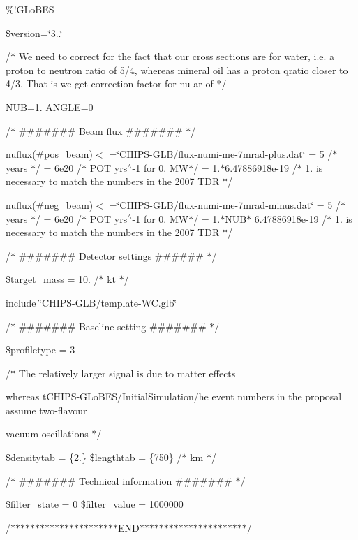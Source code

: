 \%!\+G\+Lo\+B\+ES

\$version=\char`\"{}3..\char`\"{}

/$\ast$ We need to correct for the fact that our cross sections are for water, i.\+e. a proton to neutron ratio of 5/4, whereas mineral oil has a proton qratio closer to 4/3. That is we get correction factor for nu ar of $\ast$/

N\+UB=1. A\+N\+G\+LE=0

/$\ast$ \#\#\#\#\#\#\# Beam flux \#\#\#\#\#\#\# $\ast$/

nuflux(\#pos\+\_\+beam)$<$ =\char`\"{}\+C\+H\+I\+P\+S-\/\+G\+L\+B/flux-\/numi-\/me-\/7mrad-\/plus.\+dat\char`\"{}  = 5 /$\ast$ years $\ast$/  = 6e20 /$\ast$ P\+OT yrs$^\wedge$-\/1 for 0. M\+W$\ast$/  = 1.$\ast$6.47886918e-\/19 /$\ast$ 1. is necessary to match the numbers in the 2007 T\+DR $\ast$/ \begin{quote}


\end{quote}


nuflux(\#neg\+\_\+beam)$<$ =\char`\"{}\+C\+H\+I\+P\+S-\/\+G\+L\+B/flux-\/numi-\/me-\/7mrad-\/minus.\+dat\char`\"{}  = 5 /$\ast$ years $\ast$/  = 6e20 /$\ast$ P\+OT yrs$^\wedge$-\/1 for 0. M\+W$\ast$/  = 1.$\ast$\+N\+U\+B$\ast$ 6.\+47886918e-\/19 /$\ast$ 1. is necessary to match the numbers in the 2007 T\+DR $\ast$/ \begin{quote}


\end{quote}


/$\ast$ \#\#\#\#\#\#\# Detector settings \#\#\#\#\#\# $\ast$/

\$target\+\_\+mass = 10. /$\ast$ kt $\ast$/

include \char`\"{}\+C\+H\+I\+P\+S-\/\+G\+L\+B/template-\/\+W\+C.\+glb\char`\"{}

/$\ast$ \#\#\#\#\#\#\# Baseline setting \#\#\#\#\#\#\# $\ast$/

\$profiletype = 3

/$\ast$ The relatively larger signal is due to matter effects
\begin{DoxyItemize}
\item whereas t\+C\+H\+I\+P\+S-\/\+G\+Lo\+B\+E\+S/\+Initial\+Simulation/he event numbers in the proposal assume two-\/flavour
\item vacuum oscillations $\ast$/
\end{DoxyItemize}

\$densitytab = \{2.\} \$lengthtab = \{750\} /$\ast$ km $\ast$/

/$\ast$ \#\#\#\#\#\#\# Technical information \#\#\#\#\#\#\# $\ast$/

\$filter\+\_\+state = 0 \$filter\+\_\+value = 1000000

/$\ast$$\ast$$\ast$$\ast$$\ast$$\ast$$\ast$$\ast$$\ast$$\ast$$\ast$$\ast$$\ast$$\ast$$\ast$$\ast$$\ast$$\ast$$\ast$$\ast$$\ast$$\ast$\+E\+N\+D$\ast$$\ast$$\ast$$\ast$$\ast$$\ast$$\ast$$\ast$$\ast$$\ast$$\ast$$\ast$$\ast$$\ast$$\ast$$\ast$$\ast$$\ast$$\ast$$\ast$$\ast$$\ast$/ 